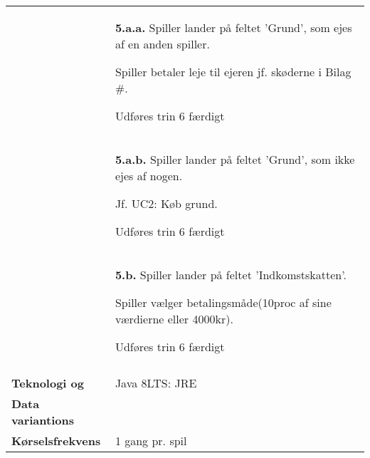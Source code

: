 \documentclass[class=article, crop=false]{standalone}
\begin{document}
\begin{table}[H]
\begin{tabularx}{\textwidth}{|l|X|}
                              & \textbf{5.a.a.} Spiller lander på feltet
                                'Grund', som ejes af en anden spiller.
                                \begin{enumerate} \begin{tabenum}
                                  \item Spiller betaler leje til ejeren
                                        jf. skøderne i Bilag \#.
                                  \item Udføres trin 6 færdigt
                                \end{tabenum} \end{enumerate}
                                \\
                            & \textbf{5.a.b.} Spiller lander på feltet
                                'Grund', som ikke ejes af nogen.
                            \begin{enumerate} \begin{tabenum}
                                  \item Jf. UC2: Køb grund.
                                  \item Udføres trin 6 færdigt
                            \end{tabenum} \end{enumerate}
                            \\
                            & \textbf{5.b.} Spiller lander på feltet
                            'Indkomstskatten'.
                            \begin{enumerate} \begin{tabenum}
                              \item Spiller vælger betalingsmåde(10proc af sine værdierne eller 4000kr).
                              \item Udføres trin 6 færdigt
                            \end{tabenum} \end{enumerate}
                            \\


                                        \\



            \hline








            \textbf{Teknologi og}     & Java 8LTS: JRE \\
            \textbf{Data variantions} &  \\ \hline
            \textbf{Kørselsfrekvens} & 1 gang pr. spil\\ \hline
        \end{tabularx}


    \end{table}
\end{document}
